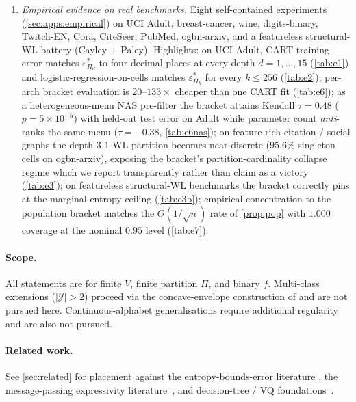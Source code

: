 \documentclass[10pt]{article}
\theoremstyle{definition}
\theoremstyle{remark}
\newcommand{\eps}{\varepsilon}
\begin{document}
\begin{enumerate}[(C1)]
  \item \emph{Empirical evidence on real benchmarks.} Eight
    self-contained experiments (\cref{sec:apps:empirical}) on
    UCI Adult, breast-cancer, wine, digits-binary, Twitch-EN,
    Cora, CiteSeer, PubMed, ogbn-arxiv, and a featureless
    structural-WL battery (Cayley + Paley). Highlights: on UCI
    Adult, CART training error matches $\eps^{*}_{\Pi_d}$ to
    four decimal places at every depth $d = 1, \ldots, 15$
    (\cref{tab:e1}) and logistic-regression-on-cells matches
    $\eps^{*}_{\Pi_k}$ for every $k \le 256$ (\cref{tab:e2});
    per-arch bracket evaluation is $20$--$133\times$ cheaper
    than one CART fit (\cref{tab:e6}); as a heterogeneous-menu
    NAS pre-filter the bracket attains Kendall $\tau = 0.48$
    ($p = 5{\times}10^{-5}$) with held-out test error on Adult
    while parameter count \emph{anti}-ranks the same menu
    ($\tau = -0.38$, \cref{tab:e6nas}); on feature-rich
    citation / social graphs the depth-$3$ $1$-WL partition
    becomes near-discrete ($95.6\%$ singleton cells on
    ogbn-arxiv), exposing the bracket's partition-cardinality
    collapse regime which we report transparently rather than
    claim as a victory (\cref{tab:e3}); on featureless
    structural-WL benchmarks the bracket correctly pins at the
    marginal-entropy ceiling (\cref{tab:e3b}); empirical
    concentration to the population
    bracket matches the $\Theta(1/\sqrt{n})$ rate of
    \cref{prop:pop} with $1.000$ coverage at the nominal
    $0.95$ level (\cref{tab:e7}).
\end{enumerate}

\paragraph{Scope.} All statements are for finite $V$, finite
partition $\Pi$, and binary $f$. Multi-class extensions
($|\mathcal{Y}| > 2$) proceed via the concave-envelope
construction of \citet{feder1994} and are not pursued here.
Continuous-alphabet generalisations require additional regularity
\citep{ho2010interplay} and are also not pursued.

\paragraph{Related work.} See \cref{sec:related} for placement
against the entropy-bounds-error literature
\citep{fano1961,hellmanraviv1970,tebbe1968uncertainty,kovalevskij1968,feder1994,hanverdu1994,ho2010interplay,sason2018arimoto},
the message-passing expressivity
literature~\citep{xu2019gin,morris2019wl,boker2024finegrained},
and decision-tree / VQ
foundations~\citep{breiman1984cart,gersho1991vq,devroye1996ptpr}.
\end{document}
